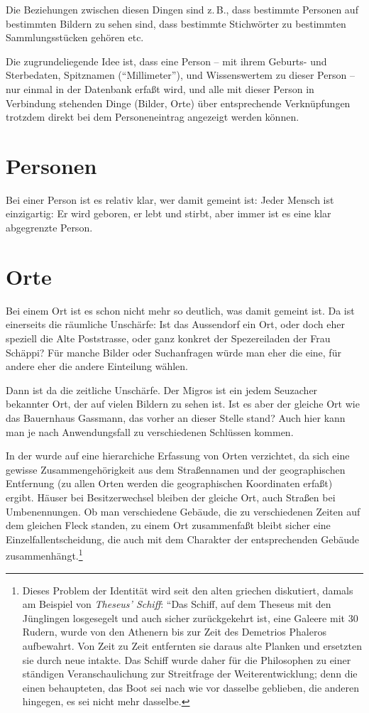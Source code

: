 \documentclass[12pt]{scrreprt}
\begin{document}
Die Beziehungen zwischen diesen Dingen sind z.\,B., dass bestimmte
Personen auf bestimmten Bildern zu sehen sind, dass bestimmte Stichwörter
zu bestimmten Sammlungsstücken gehören etc.

Die zugrundeliegende Idee ist, dass eine Person -- mit ihrem Geburts- und Sterbedaten,
Spitznamen (``Millimeter''), und Wissenswertem zu dieser Person -- nur
einmal in der Datenbank erfaßt wird, und alle mit dieser Person in Verbindung
stehenden Dinge (Bilder, Orte) über entsprechende Verknüpfungen trotzdem direkt
bei dem Personeneintrag angezeigt werden können.

\section{Personen} Bei einer Person ist es relativ klar, wer damit gemeint ist:
Jeder Mensch ist einzigartig: Er wird geboren, er lebt und stirbt, aber immer ist
es eine klar abgegrenzte Person.

\section{Orte} Bei einem Ort ist es schon nicht mehr so deutlich, was damit gemeint ist.
Da ist einerseits die räumliche Unschärfe: Ist das Aussendorf ein Ort, oder doch
eher speziell die Alte Poststrasse, oder ganz konkret der Spezereiladen der Frau Schäppi?
Für manche Bilder oder Suchanfragen würde man eher die eine, für andere eher die andere
Einteilung wählen. 

Dann ist da die zeitliche Unschärfe. Der Migros ist ein jedem Seuzacher bekannter
Ort, der auf vielen Bildern zu sehen ist. Ist es aber der gleiche Ort wie das
Bauernhaus Gassmann, das vorher an dieser Stelle stand? Auch hier kann man je nach
Anwendungsfall zu verschiedenen Schlüssen kommen.

In der \DB{} wurde auf eine hierarchiche Erfassung von Orten
verzichtet, da sich eine gewisse Zusammengehörigkeit aus dem
Straßennamen und der geographischen Entfernung (zu allen Orten werden
die geographischen Koordinaten erfaßt) ergibt. Häuser bei
Besitzerwechsel bleiben der gleiche Ort, auch Straßen bei
Umbenennungen. Ob man verschiedene Gebäude, die zu verschiedenen
Zeiten auf dem gleichen Fleck standen, zu einem Ort zusammenfaßt
bleibt sicher eine Einzelfallentscheidung, die auch mit dem Charakter
der entsprechenden Gebäude zusammenhängt.\footnote{Dieses Problem der
  Identität wird seit den alten griechen diskutiert, damals am
  Beispiel von \textit{Theseus' Schiff}: ``Das Schiff, auf dem Theseus
  mit den Jünglingen losgesegelt und auch sicher zurückgekehrt ist,
  eine Galeere mit 30 Rudern, wurde von den Athenern bis zur Zeit des
  Demetrios Phaleros aufbewahrt. Von Zeit zu Zeit entfernten sie
  daraus alte Planken und ersetzten sie durch neue intakte. Das Schiff
  wurde daher für die Philosophen zu einer ständigen Veranschaulichung
  zur Streitfrage der Weiterentwicklung; denn die einen behaupteten,
  das Boot sei nach wie vor dasselbe geblieben, die anderen hingegen,
  es sei nicht mehr dasselbe.}
\end{document}
